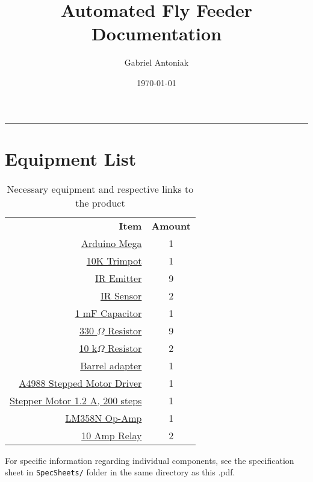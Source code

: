 \documentclass[12pt]{article}
\title{Automated Fly Feeder Documentation}
\author{Gabriel Antoniak}
\date{\today}
\newcommand{\divider}{\vspace*{-4mm} \rule{\linewidth}{1pt} \vspace{-4pt} }
\begin{document}
\maketitle
\divider

\section{Equipment List}
\renewcommand{\arraystretch}{1.2}
\begin{table}[H]
	\centering
	\begin{tabular}{| r | c |} \toprule
		\textbf{Item}  & \textbf{Amount} \\ \cline{1-2}
		\href{https://store.arduino.cc/usa/arduino-mega-2560-rev3}{Arduino Mega}   &  1\\
		\href{https://www.sparkfun.com/products/9806}{10K Trimpot}    &  1\\
		\href{https://www.sparkfun.com/products/241}{IR Emitter}     &  9\\
		\href{https://www.sparkfun.com/products/241}{IR Sensor}      &  2\\
		\href{https://www.sparkfun.com/products/8982}{1 mF Capacitor} &  1\\
		\href{https://www.sparkfun.com/products/14490}{330 $\Omega$ Resistor} &  9\\ 
		\href{https://www.sparkfun.com/products/14491}{10 k$\Omega$ Resistor} &  2\\
		\href{https://www.sparkfun.com/products/10811}{Barrel adapter} &  1\\
		\href{https://www.pololu.com/product/2128}{A4988 Stepped Motor Driver} &  1\\
		\href{https://www.pololu.com/product/1200}{Stepper Motor 1.2 A, 200 steps} & 1\\
		\href{https://www.sparkfun.com/products/9456}{LM358N Op-Amp} & 1\\
		\href{https://www.sparkfun.com/products/13815}{10 Amp Relay}  & 2\\ \bottomrule
	\end{tabular}
	\caption{Necessary equipment and respective links to the product}
	\label{tbl:equipment}
\end{table}

For specific information regarding individual components, see the specification sheet in \texttt{SpecSheets/} folder in the same directory as this .pdf.
\end{document}
